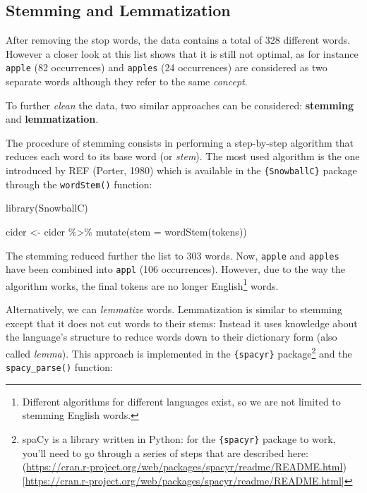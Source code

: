 \documentclass[
]{krantz}
\makeatletter
\newenvironment{Shaded}{\begin{snugshade}}{\end{snugshade}}
\newcommand{\AttributeTok}[1]{\textcolor[rgb]{0.61,0.61,0.61}{#1}}
\newcommand{\FunctionTok}[1]{\textcolor[rgb]{0,0,0}{#1}}
\newcommand{\NormalTok}[1]{#1}
\newcommand{\OtherTok}[1]{\textcolor[rgb]{0.37,0.37,0.37}{#1}}
\newcommand{\SpecialCharTok}[1]{\textcolor[rgb]{0,0,0}{#1}}
\newenvironment{kframe}{%
\medskip{}
\setlength{\fboxsep}{.8em}
 \def\at@end@of@kframe{}%
 \ifinner\ifhmode%
  \def\at@end@of@kframe{\end{minipage}}%
  \begin{minipage}{\columnwidth}%
 \fi\fi%
 \def\FrameCommand##1{\hskip\@totalleftmargin \hskip-\fboxsep
 \colorbox{shadecolor}{##1}\hskip-\fboxsep
     \hskip-\linewidth \hskip-\@totalleftmargin \hskip\columnwidth}%
 \MakeFramed {\advance\hsize-\width
   \@totalleftmargin\z@ \linewidth\hsize
   \@setminipage}}%
 {\par\unskip\endMakeFramed%
 \at@end@of@kframe}
\renewenvironment{Shaded}{\begin{kframe}}{\end{kframe}}
\makeatother
\begin{document}
\hypertarget{stemming-and-lemmatization}{%
\subsection{Stemming and Lemmatization}\label{stemming-and-lemmatization}}

After removing the stop words, the data contains a total of 328 different words. However a closer look at this list shows that it is still not optimal, as for instance \texttt{apple} (82 occurrences) and \texttt{apples} (24 occurrences) are considered as two separate words although they refer to the same \emph{concept}.

To further \emph{clean} the data, two similar approaches can be considered: \textbf{stemming} and \textbf{lemmatization}.

The procedure of stemming consists in performing a step-by-step algorithm that reduces each word to its base word (or \emph{stem}). The most used algorithm is the one introduced by REF (Porter, 1980) which is available in the \texttt{\{SnowballC\}} package through the \texttt{wordStem()} function:

\begin{Shaded}
\begin{Highlighting}[]
\FunctionTok{library}\NormalTok{(SnowballC)}

\NormalTok{cider }\OtherTok{\textless{}{-}}\NormalTok{ cider }\SpecialCharTok{\%\textgreater{}\%} 
  \FunctionTok{mutate}\NormalTok{(}\AttributeTok{stem =} \FunctionTok{wordStem}\NormalTok{(tokens))}
\end{Highlighting}
\end{Shaded}

The stemming reduced further the list to 303 words. Now, \texttt{apple} and \texttt{apples} have been combined into \texttt{appl} (106 occurrences). However, due to the way the algorithm works, the final tokens are no longer English\footnote{Different algorithms for different languages exist, so we are not limited to stemming English words.} words.

Alternatively, we can \emph{lemmatize} words. Lemmatization is similar to stemming except that it does not cut words to their stems: Instead it uses knowledge about the language's structure to reduce words down to their dictionary form (also called \emph{lemma}). This approach is implemented in the \texttt{\{spacyr\}} package\footnote{spaCy is a library written in Python: for the \texttt{\{spacyr\}} package to work, you'll need to go through a series of steps that are described here: (\url{https://cran.r-project.org/web/packages/spacyr/readme/README.html}){[}\url{https://cran.r-project.org/web/packages/spacyr/readme/README.html}{]}} and the \texttt{spacy\_parse()} function:
\end{document}
